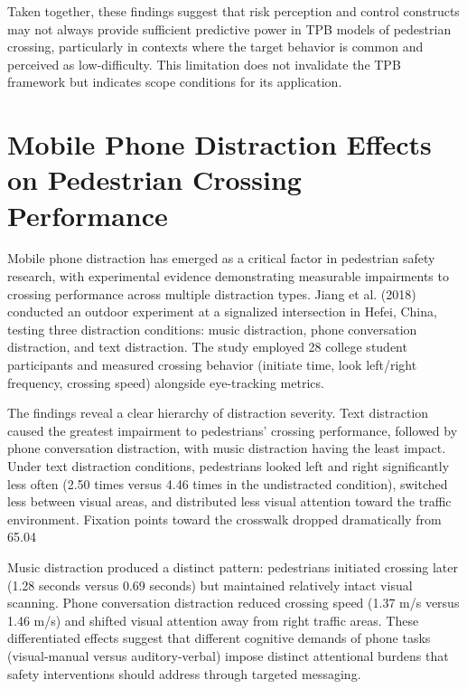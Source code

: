 \documentclass{article}
\begin{document}
Taken together, these findings suggest that risk perception and control constructs may not always provide sufficient predictive power in TPB models of pedestrian crossing, particularly in contexts where the target behavior is common and perceived as low-difficulty. This limitation does not invalidate the TPB framework but indicates scope conditions for its application. \cite{08_2016_zhou_aap}

\section{Mobile Phone Distraction Effects on Pedestrian Crossing Performance}
Mobile phone distraction has emerged as a critical factor in pedestrian safety research, with experimental evidence demonstrating measurable impairments to crossing performance across multiple distraction types. Jiang et al. (2018) conducted an outdoor experiment at a signalized intersection in Hefei, China, testing three distraction conditions: music distraction, phone conversation distraction, and text distraction. The study employed 28 college student participants and measured crossing behavior (initiate time, look left/right frequency, crossing speed) alongside eye-tracking metrics. \cite{09_2018_jiang_aap}

The findings reveal a clear hierarchy of distraction severity. Text distraction caused the greatest impairment to pedestrians' crossing performance, followed by phone conversation distraction, with music distraction having the least impact. Under text distraction conditions, pedestrians looked left and right significantly less often (2.50 times versus 4.46 times in the undistracted condition), switched less between visual areas, and distributed less visual attention toward the traffic environment. Fixation points toward the crosswalk dropped dramatically from 65.04%

Music distraction produced a distinct pattern: pedestrians initiated crossing later (1.28 seconds versus 0.69 seconds) but maintained relatively intact visual scanning. Phone conversation distraction reduced crossing speed (1.37 m/s versus 1.46 m/s) and shifted visual attention away from right traffic areas. These differentiated effects suggest that different cognitive demands of phone tasks (visual-manual versus auditory-verbal) impose distinct attentional burdens that safety interventions should address through targeted messaging. \cite{09_2018_jiang_aap}
\end{document}
